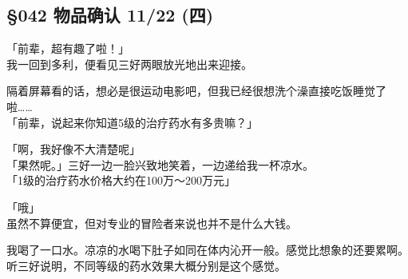\subsection{§042 物品确认 11/22 (四)}

「前辈，超有趣了啦！」\\

我一回到多利，便看见三好两眼放光地出来迎接。

隔着屏幕看的话，想必是很运动电影吧，但我已经很想洗个澡直接吃饭睡觉了啦……\\

「前辈，说起来你知道5级的治疗药水有多贵嘛？」

「啊，我好像不大清楚呢」\\

「果然呢。」三好一边一脸兴致地笑着，一边递给我一杯凉水。\\

「1级的治疗药水价格大约在100万～200万元」

「哦」\\

虽然不算便宜，但对专业的冒险者来说也并不是什么大钱。

我喝了一口水。凉凉的水喝下肚子如同在体内沁开一般。感觉比想象的还要累啊。\\

听三好说明，不同等级的药水效果大概分别是这个感觉。\\

